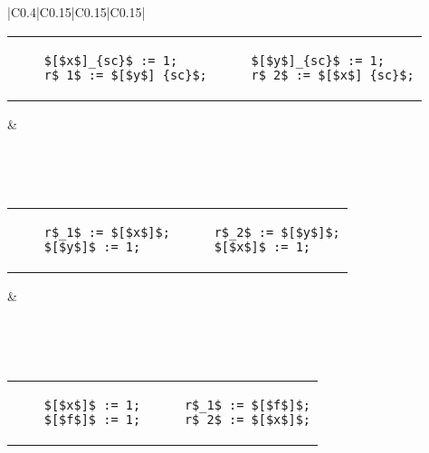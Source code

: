 \begin{table}
\begin{tabular}{|C{0.4\textwidth}|C{0.15\textwidth}|C{0.15\textwidth}|C{0.15\textwidth}|}
    \\ \hline
    
    \begin{tabular}{@{\hskip -15pt}l|@{\hskip 5pt}|@{\hskip -15pt}l}
    \begin{lstlisting}
    $[$x$]_{sc}$ := 1;
    r$_1$ := $[$y$]_{sc}$;
    \end{lstlisting}
    &
    \begin{lstlisting}
    $[$y$]_{sc}$ := 1;
    r$_2$ := $[$x$]_{sc}$;
    \end{lstlisting}
    \end{tabular}
    
    & 
    
    
    \\ \hline
    
      \\ \hline
    
    \begin{tabular}{@{\hskip -15pt}l|@{\hskip 5pt}|@{\hskip -15pt}l}
    \begin{lstlisting}
    r$_1$ := $[$x$]$;
    $[$y$]$ := 1;
    \end{lstlisting}
    &
    \begin{lstlisting}
    r$_2$ := $[$y$]$;
    $[$x$]$ := 1;
    \end{lstlisting}
    \end{tabular}
    
    &
    
    
    \\ \hline
    
      \\ \hline
    
    \begin{tabular}{@{\hskip -15pt}l|@{\hskip 5pt}|@{\hskip -15pt}l}
    \begin{lstlisting}
    $[$x$]$ := 1;
    $[$f$]$ := 1;
    \end{lstlisting}
    &
    \begin{lstlisting}
    r$_1$ := $[$f$]$;
    r$_2$ := $[$x$]$;
    \end{lstlisting}
    \end{tabular}
    

\end{tabular}
\end{table}
